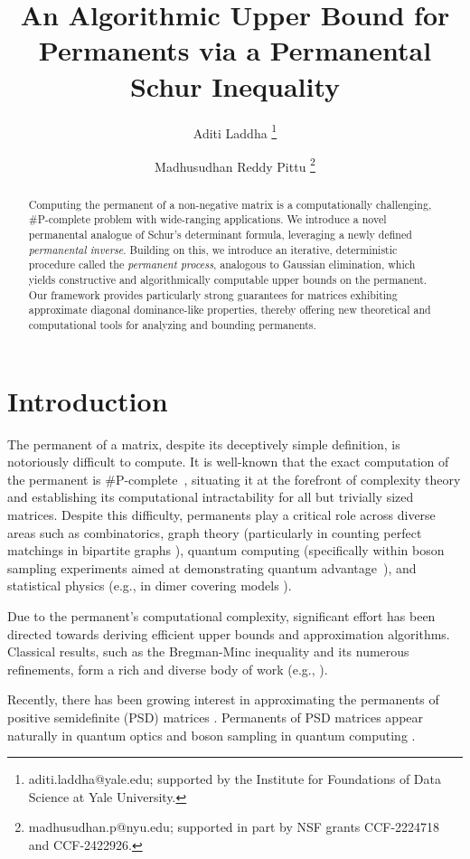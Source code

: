 \documentclass[11pt]{article}
\title{An Algorithmic Upper Bound for Permanents via a Permanental Schur Inequality}
\date{}
\author{Aditi Laddha \thanks{aditi.laddha@yale.edu; supported by the Institute for Foundations of Data Science at Yale University.}
\and Madhusudhan Reddy Pittu \thanks{madhusudhan.p@nyu.edu; supported in part by NSF grants CCF-2224718 and CCF-2422926.}}
\theoremstyle{definition}
\begin{document}
\maketitle
\begin{abstract}
Computing the permanent of a non-negative matrix is a computationally challenging, \#P-complete problem with wide-ranging applications. We introduce a novel permanental analogue of Schur's determinant formula, leveraging a newly defined \emph{permanental inverse}. Building on this, we introduce an iterative, deterministic procedure called the \emph{permanent process}, analogous to Gaussian elimination, which yields constructive and algorithmically computable upper bounds on the permanent. Our framework provides particularly strong guarantees for matrices exhibiting approximate diagonal dominance-like properties, thereby offering new theoretical and computational tools for analyzing and bounding permanents.
\end{abstract}

\section{Introduction}
The permanent of a matrix, despite its deceptively simple definition, is notoriously difficult to compute. It is well-known that the exact computation of the permanent is \#P-complete~\cite{valiant-permanet-hardness}, situating it at the forefront of complexity theory and establishing its computational intractability for all but trivially sized matrices. Despite this difficulty, permanents play a critical role across diverse areas such as combinatorics, graph theory (particularly in counting perfect matchings in bipartite graphs \cite{Minc_book-84}), quantum computing (specifically within boson sampling experiments aimed at demonstrating quantum advantage~\cite{AA11-boson-sampling}), and statistical physics (e.g., in dimer covering models \cite{HLLB08-monomer-dimer}).

Due to the permanent's computational complexity, significant effort has been directed towards deriving efficient upper bounds and approximation algorithms. Classical results, such as the Bregman-Minc inequality and its numerous refinements, form a rich and diverse body of work (e.g., \cite{Minc_binary63, Marcus-Minc_perm65, Bregman73, Schrijver_Minc-78, Minc_book-84, Schrijver_matching-98, HKM-98, LB-04, Samorodnitsky-08, Soules_minc-00, Soules_nonnegative-03, GS-14}). 

Recently, there has been growing interest in approximating the permanents of positive semidefinite (PSD) matrices \cite{anari2017simply, yuan2022maximizing, meiburg2023inapproximability, ebrahimnejad2025approximability}. Permanents of PSD matrices appear naturally in quantum optics and boson sampling in quantum computing \cite{aaronson2011computational,scheel2004permanents, shirai2003random}.
\end{document}
